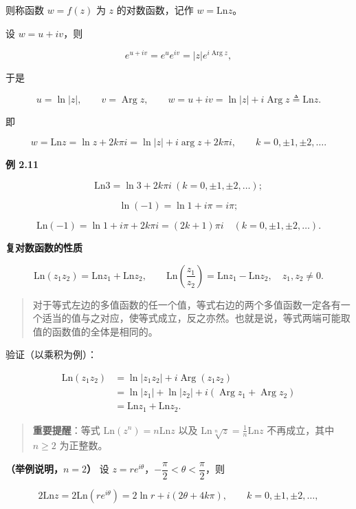 则称函数 \(w=f(z)\) 为 \(z\) 的对数函数，记作 \(w=\mathrm{Ln}z\)。

设 \(w=u+iv\)，则

\[
e^{u+iv}=e^u e^{iv}=|z|e^{i\operatorname{Arg}z},
\]

于是

\[
u=\ln|z|,\qquad v=\operatorname{Arg}z,\qquad
w=u+iv=\ln|z|+i\operatorname{Arg}z\triangleq\mathrm{Ln}z .
\]

即

\[
w=\mathrm{Ln}z=\ln z+2k\pi i=\ln|z|+i\arg z+2k\pi i,\qquad k=0,\pm1,\pm2,\ldots .
\]

\textbf{例 2.11}

\[
\mathrm{Ln}3=\ln 3+2k\pi i\ (k=0,\pm1,\pm2,\ldots);
\]

\[
\ln(-1)=\ln 1+i\pi=i\pi;
\]

\[
\mathrm{Ln}(-1)=\ln1+i\pi+2k\pi i=(2k+1)\pi i\quad(k=0,\pm1,\pm2,\ldots).
\]

\textbf{复对数函数的性质}

\[
\mathrm{Ln}(z_1z_2)=\mathrm{Ln}z_1+\mathrm{Ln}z_2,\qquad
\mathrm{Ln}\left(\frac{z_1}{z_2}\right)=\mathrm{Ln}z_1-\mathrm{Ln}z_2,\quad z_1,z_2\neq 0 .
\]

\begin{quote}
对于等式左边的多值函数的任一个值，等式右边的两个多值函数一定各有一个适当的值与之对应，使等式成立，反之亦然。也就是说，等式两端可能取值的函数值的全体是相同的。
\end{quote}

验证（以乘积为例）：

\[
\begin{aligned}
\mathrm{Ln}(z_1z_2)
&=\ln|z_1z_2|+i\operatorname{Arg}(z_1z_2)\\
&=\ln|z_1|+\ln|z_2|+i(\operatorname{Arg}z_1+\operatorname{Arg}z_2)\\
&=\mathrm{Ln}z_1+\mathrm{Ln}z_2 .
\end{aligned}
\]

\begin{quote}
\textbf{重要提醒}：等式 \(\mathrm{Ln}(z^n)=n\mathrm{Ln}z\) 以及
\(\mathrm{Ln}\sqrt[n]{z}=\frac{1}{n}\mathrm{Ln}z\) 不再成立，其中
\(n\ge2\) 为正整数。
\end{quote}

\textbf{（举例说明，\(n=2\)）} 设
\(z=re^{i\theta}\)，\(-\dfrac{\pi}{2}<\theta<\dfrac{\pi}{2}\)，则

\[
2\mathrm{Ln}z=2\mathrm{Ln}\left(re^{i\theta}\right)=2\ln r+i(2\theta+4k\pi),\qquad k=0,\pm1,\pm2,\ldots,
\]

